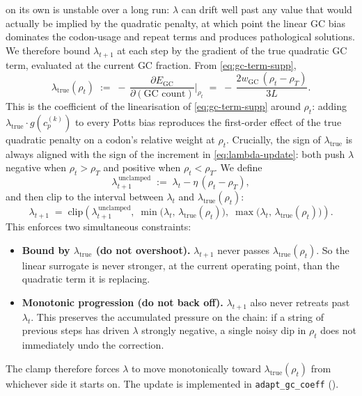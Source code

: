 \documentclass[11pt]{article}
\begin{document}
 on its own is unstable over a long run: $\lambda$ can drift well past any value that would actually be implied by the quadratic penalty, at which point the linear GC bias dominates the codon-usage and repeat terms and produces pathological solutions.
We therefore bound $\lambda_{t+1}$ at each step by the gradient of the true quadratic GC term, evaluated at the current GC fraction.
From \cref{eq:gc-term-supp},
\begin{equation}\label{eq:lambda-true}
  \lambda_{\mathrm{true}}(\rho_t)
  \;\mathrel{:=}\; -\,\frac{\partial E_{\mathrm{GC}}}{\partial (\text{GC count})}\bigg|_{\rho_t}
  \;=\; -\,\frac{2 w_{\mathrm{GC}} \,(\rho_t - \rho_T)}{3L}.
\end{equation}
This is the coefficient of the linearisation of \cref{eq:gc-term-supp} around $\rho_t$: adding $\lambda_{\mathrm{true}} \cdot g(c_p^{(k)})$ to every Potts bias reproduces the first-order effect of the true quadratic penalty on a codon's relative weight at $\rho_t$.
Crucially, the sign of $\lambda_{\mathrm{true}}$ is always aligned with the sign of the increment in \cref{eq:lambda-update}: both push $\lambda$ negative when $\rho_t > \rho_T$ and positive when $\rho_t < \rho_T$.
We define
\begin{equation}
  \lambda_{t+1}^{\,\mathrm{unclamped}} \;\mathrel{:=}\; \lambda_t - \eta\,(\rho_t - \rho_T),
\end{equation}
and then clip to the interval between $\lambda_t$ and $\lambda_{\mathrm{true}}(\rho_t)$:
\begin{equation}\label{eq:clip}
\boxed{\;
  \lambda_{t+1} \;=\; \mathrm{clip}\!\left(\lambda_{t+1}^{\,\mathrm{unclamped}},\;
    \min\!\big(\lambda_t,\,\lambda_{\mathrm{true}}(\rho_t)\big),\;
    \max\!\big(\lambda_t,\,\lambda_{\mathrm{true}}(\rho_t)\big)\right).
\;}
\end{equation}
This enforces two simultaneous constraints:
\begin{itemize}
  \item \textbf{Bound by $\lambda_{\mathrm{true}}$ (do not overshoot).}
    $\lambda_{t+1}$ never passes $\lambda_{\mathrm{true}}(\rho_t)$.
    So the linear surrogate is never stronger, at the current operating point, than the quadratic term it is replacing.
  \item \textbf{Monotonic progression (do not back off).}
    $\lambda_{t+1}$ also never retreats past $\lambda_t$.
    This preserves the accumulated pressure on the chain: if a string of previous steps has driven $\lambda$ strongly negative, a single noisy dip in $\rho_t$ does not immediately undo the correction.
\end{itemize}
The clamp therefore forces $\lambda$ to move monotonically toward $\lambda_{\mathrm{true}}(\rho_t)$ from whichever side it starts on.
The update is implemented in \texttt{adapt\_gc\_coeff} ().
\end{document}
